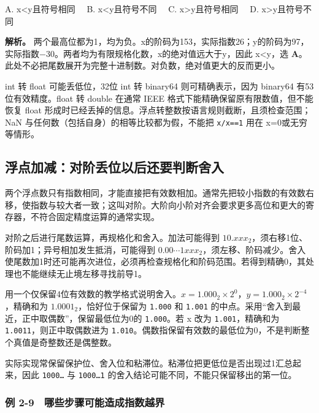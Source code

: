 A. x\textless y且符号相同　 B. x\textless y且符号不同　 C. x\textgreater y且符号相同　 D. x\textgreater y且符号不同


\textbf{解析。} 两个最高位都为1，均为负。x的阶码为153，实际指数26；y的阶码为97，实际指数−30。两者均为有限规格化数，x的绝对值远大于y，因此 x\textless y，选 \textbf{A}。此处不必把尾数展开为完整十进制数。对负数，绝对值更大的反而更小。

int 转 float 可能丢低位，32位 int 转 binary64 则可精确表示，因为 binary64 有53位有效精度。float 转 double 在通常 IEEE 格式下能精确保留原有限数值，但不能恢复 float 形成时已经丢掉的信息。浮点转整数按语言规则截断，且须检查范围；NaN 与任何数（包括自身）的相等比较都为假，不能把 \texttt{x/x==1} 用在 x=0或无穷等情形。

\subsection{浮点加减：对阶丢位以后还要判断舍入}\label{co-02-08}

两个浮点数只有指数相同，才能直接把有效数相加。通常先把较小指数的有效数右移，使指数与较大者一致；这叫对阶。大阶向小阶对齐会要求更多高位和更大的寄存器，不符合固定精度运算的通常实现。

对阶之后进行尾数运算，再规格化和舍入。加法可能得到 \(10.xxx_2\)，须右移1位、阶码加1；异号相加发生抵消，可能得到 \(0.00\cdots1xxx_2\)，须左移、阶码减少。舍入使尾数加1时还可能再次进位，必须再检查规格化和阶码范围。若得到精确0，其处理也不能继续无止境左移寻找前导1。

用一个仅保留4位有效数的教学格式说明舍入。\(x=1.000_2\times2^0\)，\(y=1.000_2\times2^{-4}\)，精确和为 \(1.0001_2\)，恰好位于保留为 \texttt{1.000} 和 \texttt{1.001} 的中点。采用``舍入到最近，正中取偶数''，保留最低位为0的 \texttt{1.000}。若 x 改为 \texttt{1.001}，精确和为 \texttt{1.0011}，则正中取偶数进为 \texttt{1.010}。偶数指保留有效数的最低位为0，不是判断整个真值是奇整数还是偶整数。

实际实现常保留保护位、舍入位和粘滞位。粘滞位把更低位是否出现过1汇总起来，因此 \texttt{1000…} 与 \texttt{1000…1} 的舍入结论可能不同，不能只保留移出的第一位。


\subsubsection{例 2-9　哪些步骤可能造成指数越界}\label{co-ex2-9}

